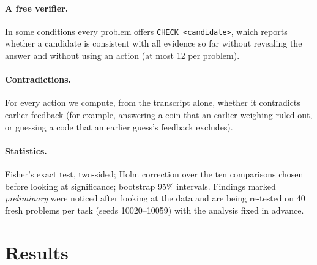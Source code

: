 \documentclass[11pt]{article}
\begin{document}
\paragraph{A free verifier.} In some conditions every problem offers \texttt{CHECK <candidate>}, which reports
whether a candidate is consistent with all evidence so far without revealing the answer and without using an
action (at most 12 per problem).

\paragraph{Contradictions.} For every action we compute, from the transcript alone, whether it contradicts earlier
feedback (for example, answering a coin that an earlier weighing ruled out, or guessing a code that an earlier
guess's feedback excludes).

\paragraph{Statistics.} Fisher's exact test, two-sided; Holm correction over the ten comparisons chosen before
looking at significance; bootstrap 95\% intervals. Findings marked \emph{preliminary} were noticed after looking at
the data and are being re-tested on 40 fresh problems per task (seeds 10020--10059) with the analysis fixed in
advance.

\section{Results}
\end{document}
